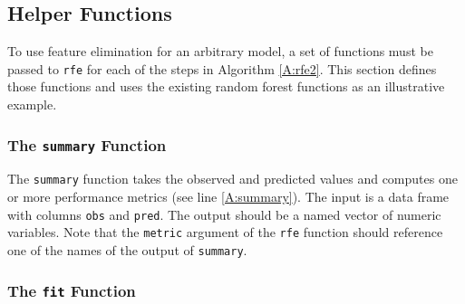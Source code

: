 \documentclass[12pt]{article}
\begin{document}
\subsection{Helper Functions}\label{S:helpers}

To use feature elimination for an arbitrary model, a set of functions must be passed to \texttt{rfe} for each of the steps in Algorithm  \ref{A:rfe2}. This section defines those functions and uses the existing random forest functions as an illustrative example.

\subsubsection{The \texttt{summary} Function}

The \texttt{summary} function takes the observed and predicted values and computes one or more performance metrics (see line \ref{A:summary}). The input is a data frame with columns \texttt{obs} and \texttt{pred}. The output should be a named vector of numeric variables. Note that the \texttt{metric} argument of the \texttt{rfe} function should reference one of the names of the output of \texttt{summary}.

\subsubsection{The \texttt{fit} Function}
\end{document}
